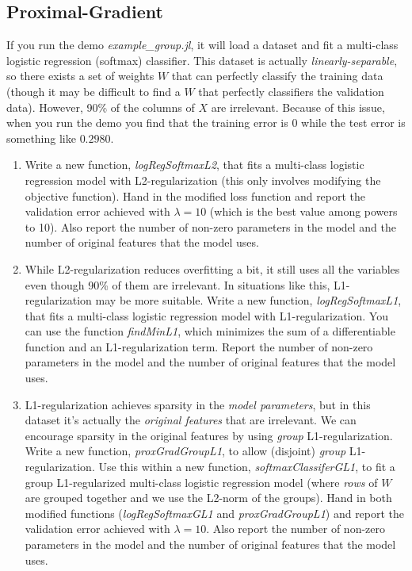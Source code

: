 \documentclass{article}
\def\blu#1{{\color{blu}#1}}
\def\enum#1{\begin{enumerate}#1\end{enumerate}}
\begin{document}
\subsection{Proximal-Gradient}


If you run the demo \emph{example\_group.jl}, it will load a dataset and fit a multi-class logistic regression (softmax) classifier. This dataset is actually \emph{linearly-separable}, so there exists a set of weights $W$ that can perfectly classify the training data (though it may be difficult to find a $W$ that perfectly classifiers the validation data). However, 90\% of the columns of $X$ are irrelevant. Because of this issue, when you run the demo you find that the training error is $0$ while the test error is something like $0.2980$.

\enum{
\item Write a new function, \emph{logRegSoftmaxL2}, that fits a multi-class logistic regression model with L2-regularization (this only involves modifying the objective function). \blu{Hand in the modified loss function and report the validation error achieved with $\lambda = 10$ (which is the  best value among powers to 10). Also report the number of non-zero parameters in the model and the number of original features that the model uses}.
\item While L2-regularization reduces overfitting a bit, it still uses all the variables even though 90\% of them are irrelevant. In situations like this, L1-regularization may be more suitable. Write a new function, \emph{logRegSoftmaxL1}, that fits a multi-class logistic regression model with L1-regularization. You can use the function \emph{findMinL1}, which minimizes the sum of a differentiable function and an L1-regularization term.  \blu{Report the number of non-zero parameters in the model and the number of original features that the model uses}.
\item L1-regularization achieves sparsity in the \emph{model parameters}, but in this dataset it's actually the \emph{original features} that are irrelevant. We can encourage sparsity in the original features by using \emph{group} L1-regularization. Write a new function, \emph{proxGradGroupL1}, to allow (disjoint) \emph{group} L1-regularization. Use this within a new function, \emph{softmaxClassiferGL1}, to fit a group L1-regularized multi-class logistic regression model (where \emph{rows} of $W$ are grouped together and we use the L2-norm of the groups).  \blu{Hand in both modified  functions (\emph{logRegSoftmaxGL1} and \emph{proxGradGroupL1}) and report the validation error achieved with $\lambda=10$. Also report the number of non-zero parameters in the model and the number of original features that the model uses}.
}
\end{document}
